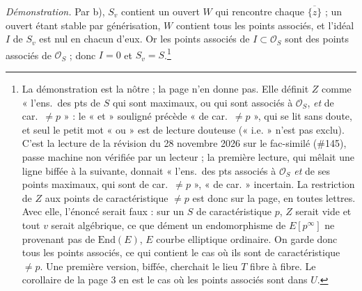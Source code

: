 \documentclass[11pt,a4paper]{article}
\begin{document}
\emph{Démonstration.} Par b), $S_v$ contient un ouvert $W$ qui rencontre
chaque $\overline{\{z\}}$ ; un ouvert étant stable par générisation, $W$
contient tous les points associés, et l'idéal $I$ de $S_v$ est nul en
chacun d'eux. Or les points associés de $I \subset \mathcal{O}_S$ sont des
points associés de $\mathcal{O}_S$ ; donc $I = 0$ et $S_v = S$.\footnote{La
démonstration est la nôtre ; la page n'en donne pas. Elle définit $Z$ comme
« l'ens.\ des pts de $S$ qui sont maximaux, ou qui sont associés à
$\mathcal{O}_S$, \emph{et} de car.\ $\neq p$ » : le « et » souligné précède
« de car.\ $\neq p$ », qui se lit sans doute, et seul le petit mot « ou »
est de lecture douteuse (« i.e. » n'est pas exclu). C'est la lecture de la
révision du 28 novembre 2026 sur le fac-similé (\#145), passe machine non vérifiée par un lecteur ; la première lecture, qui
mêlait une ligne biffée à la suivante, donnait « l'ens.\ des pts associés à
$\mathcal{O}_S$ \emph{et} de ses points maximaux, qui sont de car.\
$\neq p$ », « de car. » incertain. La restriction de $Z$ aux points de
caractéristique $\neq p$ est donc sur la page, en toutes lettres. Avec elle,
l'énoncé serait faux : sur un $S$ de
caractéristique $p$, $Z$ serait vide et tout $v$ serait algébrique, ce que
dément un endomorphisme de $E[p^\infty]$ ne provenant pas de
$\mathrm{End}(E)$, $E$ courbe elliptique ordinaire. On garde donc tous les
points associés, ce qui contient le cas où ils sont de caractéristique
$\neq p$. Une première
version, biffée, cherchait le lieu $T$ fibre à fibre. Le corollaire de la
page 3 en est le cas où les points associés sont dans $U$.}
\end{document}
